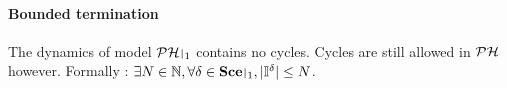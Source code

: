 \paragraph{Bounded termination}
The dynamics of model $\restriction{\PH}{1}$ contains no cycles. Cycles are still allowed in $\mathcal{PH}$ however.
Formally : $\exists N \in \sN, \forall \delta \in \restriction{\Sce}{1}, |\indexes{\delta}| \leq N$.



\begin{comment}
\paragraph{Bounded termination}
The dynamics of model $\restriction{\PH}{k-1}$ contains no cycles. Cycles are still allowed in $\PH$ however.
Formally : $\exists N \in \sN, \forall \delta \in \restriction{\Sce}{k-1}, |\indexes{\delta}| \leq N$.

\paragraph{Local priorities}
\towrite{Justification}
All actions hitting the same sort belong to the same class of priority:
$$\forall h_1, h_2 \in \PHh, \PHtarget(h_1) = \PHtarget(h_2) \Rightarrow \prio(h_1) = \prio(h_2)$$
Furthermore, for all sort $a$, we denote $\prio(a)$ the priority of the actions hitting $a$, if any:
$$\forall a \in \PHs, \exists h \in \PHh, \PHtarget(h) = a \Rightarrow \prio(a) = \prio(h)$$
\towrite{Ou : $\nexists h \Rightarrow \prio(a) = 0$}

\paragraph{Local stable states}
\towrite{Justification}
We define $\pfp$ as the set of possible stable states of a sort from a given state:
\begin{align*}
  \pfp_\ctx = \{ s \PHplay \delta \in \PHl &\mid s \in \ctx \wedge \delta \in \restriction{\Sce}{k-1} \\
  & \qquad \wedge \forall \PHhit{b_i}{c_j}{c_k} \in \restriction{\PHh}{k-1}, \PHget{(s \PHplay \delta)}{b} \neq b_i \vee \PHget{(s \PHplay \delta)}{c} \neq c_j \}
\end{align*}

All processes are a stable state of a sub-state of the predecessors:
$\forall a_i \in \PHproc, \prio(a) < k \Rightarrow \exists s \in \restriction{\PHl}{\Vs(a)}, a_i \in \pfp_s$.
We note: $\stable_{a_i} = \{ s \in \restriction{\PHl}{\Vs(a)} \mid a_i \in \pfp_s \}$.
\end{comment}

